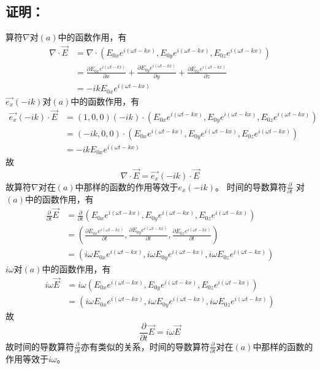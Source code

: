 \documentclass[10pt,a4paper]{article}
\theoremstyle{remark}
\begin{document}
\subsection{证明：}
算符$\nabla$对$(a)$中的函数作用，有
\[
\begin{split}
\nabla\cdot\overrightarrow{E} &= \nabla\cdot(E_{0x}e^{i(\omega t-kx)},E_{0y}e^{i(\omega t-kx)},E_{0z}e^{i(\omega t-kx)})\\
&= \frac{\partial E_{0x}e^{i(\omega t-kx)}}{\partial x} + \frac{\partial E_{0y}e^{i(\omega t-kx)}}{\partial y} + \frac{\partial E_{0z}e^{i(\omega t-kx)}}{\partial z}\\
&= -ikE_{0x}e^{i(\omega t-kx)}
\end{split}
\]
$\overrightarrow{e_x}(-ik)$对$(a)$中的函数作用，有
\[
\begin{split}
\overrightarrow{e_x}(-ik)\cdot\overrightarrow{E} &= (1,0,0)(-ik)\cdot(E_{0x}e^{i(\omega t-kx)},E_{0y}e^{i(\omega t-kx)},E_{0z}e^{i(\omega t-kx)})\\
&= (-ik,0,0)\cdot(E_{0x}e^{i(\omega t-kx)},E_{0y}e^{i(\omega t-kx)},E_{0z}e^{i(\omega t-kx)})\\
&= -ikE_{0x}e^{i(\omega t-kx)}
\end{split}
\]
故
\begin{equation}
\nabla\cdot\overrightarrow{E} = \overrightarrow{e_x}(-ik)\cdot\overrightarrow{E}
\end{equation}
故算符$\nabla$对在$(a)$中那样的函数的作用等效于$e_x(-ik)$。
时间的导数算符$\frac{\partial}{\partial t}$ 对$(a)$中的函数作用，有
\[
\begin{split}
\frac{\partial}{\partial t}\overrightarrow{E} &= \frac{\partial}{\partial t}(E_{0x}e^{i(\omega t-kx)},E_{0y}e^{i(\omega t-kx)},E_{0z}e^{i(\omega t-kx)})\\
&= (\frac{\partial E_{0x}e^{i(\omega t-kx)}}{\partial t},\frac{\partial E_{0y}e^{i(\omega t-kx)}}{\partial t},\frac{\partial E_{0z}e^{i(\omega t-kx)}}{\partial t})\\
&= (i\omega E_{0x}e^{i(\omega t-kx)},i\omega E_{0y}e^{i(\omega t-kx)},i\omega E_{0z}e^{i(\omega t-kx)})
\end{split}
\]
$i\omega$对$(a)$中的函数作用，有
\[
\begin{split}
i\omega\overrightarrow{E} &= i\omega(E_{0x}e^{i(\omega t-kx)},E_{0y}e^{i(\omega t-kx)},E_{0z}e^{i(\omega t-kx)})\\
&= (i\omega E_{0x}e^{i(\omega t-kx)},i\omega E_{0y}e^{i(\omega t-kx)},i\omega E_{0z}e^{i(\omega t-kx)})
\end{split}
\]
故
\begin{equation}
\frac{\partial}{\partial t}\overrightarrow{E} = i\omega\overrightarrow{E}
\end{equation}
故时间的导数算符$\frac{\partial}{\partial t}$亦有类似的关系，时间的导数算符$\frac{\partial}{\partial t}$对在$(a)$中那样的函数的作用等效于$i\omega$。
\end{document}
